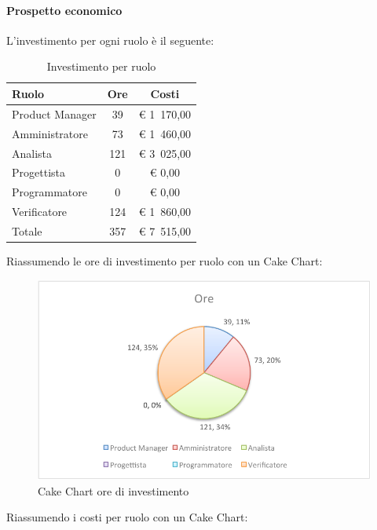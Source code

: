 			\paragraph{Prospetto economico}
				L'investimento per ogni ruolo è il seguente:
				\begin{table}[H]
					\begin{center}
						\begin{tabular}{| l | c | c |}
							\hline
							Ruolo 			& Ore 		& Costi  \\ \hline
							
							Product Manager	& 39 		& \euro{} 1~170,00 	\\
							Amministratore 		& 73 		& \euro{} 1~460,00 	\\
							Analista	 		& 121 	& \euro{} 3~025,00 	\\
							Progettista 		& 0		& \euro{} 0,00 	\\
							Programmatore		& 0		& \euro{} 0,00	\\
							Verificatore		& 124 	& \euro{} 1~860,00 	\\ \hline \hline
							
							Totale	 		& 357 	& \euro{} 7~515,00 	\\ \hline
						\end{tabular}
					\end{center}
					\caption{Investimento per ruolo}
				\end{table}
				Riassumendo le ore di investimento per ruolo con un Cake Chart:
				\begin{figure}[H]\centering
					\includegraphics[width=\textwidth]{PianoDiProgetto/Pics/ChartTotOreInvest.pdf}
					\caption{Cake Chart ore di investimento}
				\end{figure}
				Riassumendo i costi per ruolo con un Cake Chart:
